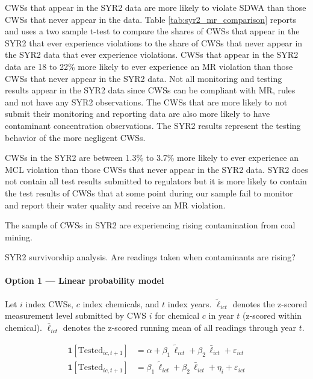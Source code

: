 \documentclass{article}
\begin{document}
CWSs that appear in the SYR2 data are more likely to violate SDWA than those CWSs that never appear in the data. Table \ref{tab:syr2_mr_comparison} reports and uses a two sample t-test to compare the shares of CWSs that appear in the SYR2 that ever experience violations to the share of CWSs that never appear in the SYR2 data that ever experience violations. CWSs that appear in the SYR2 data are 18 to 22\% more likely to ever experience an MR violation than those CWSs that never appear in the SYR2 data. Not all monitoring and testing results appear in the SYR2 data since CWSs can be compliant with MR, rules and not have any SYR2 observations. The CWSs that are more likely to not submit their monitoring and reporting data are also more likely to have contaminant concentration observations. The SYR2 results represent the testing behavior of the more negligent CWSs. 

CWSs in the SYR2 are between 1.3\% to 3.7\% more likely to ever experience an MCL violation than those CWSs that never appear in the SYR2 data. SYR2 does not contain all test results submitted to regulators but it is more likely to contain the test results of CWSs that at some point during our sample fail to monitor and report their water quality and receive an MR violation.

The sample of CWSs in SYR2 are experiencing rising contamination from coal mining.



SYR2 survivorship analysis. Are readings taken when contaminants are rising?

\paragraph*{Option 1 --- Linear probability model}

Let $i$ index CWSs, $c$ index chemicals, and $t$ index years.
$\widetilde{\ell}_{ict}$ denotes the z-scored measurement level submitted
by CWS $i$ for chemical $c$ in year $t$ (z-scored within chemical).
$\bar{\ell}_{ict}$ denotes the z-scored running mean of all readings
through year $t$.

\begin{align}
  \mathbf{1}[\text{Tested}_{ic,t+1}]
    &= \alpha + \beta_1\,\widetilde{\ell}_{ict}
             + \beta_2\,\bar{\ell}_{ict}
             + \varepsilon_{ict}
    \label{eq:lpm-nofe} \\[6pt]
  \mathbf{1}[\text{Tested}_{ic,t+1}]
    &= \beta_1\,\widetilde{\ell}_{ict}
     + \beta_2\,\bar{\ell}_{ict}
     + \eta_i + \varepsilon_{ict}
    \label{eq:lpm-fe}
\end{align}
\end{document}
